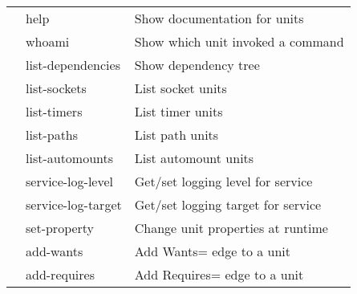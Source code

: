 \documentclass[openany, 12pt]{book}
\begin{document}
\begin{longtable}{lll}
                & help                   & Show documentation for units            \\
                & whoami                 & Show which unit invoked a command       \\
                & list-dependencies      & Show dependency tree                    \\
                & list-sockets           & List socket units                       \\
                & list-timers            & List timer units                        \\
                & list-paths             & List path units                         \\
                & list-automounts        & List automount units                    \\
                & service-log-level      & Get/set logging level for service       \\
                & service-log-target     & Get/set logging target for service      \\
                & set-property           & Change unit properties at runtime       \\
                & add-wants              & Add Wants= edge to a unit               \\
                & add-requires           & Add Requires= edge to a unit            \\
\end{longtable}

\glsaddallunused{}

\clearpage
\printglossaries

\end{document}
